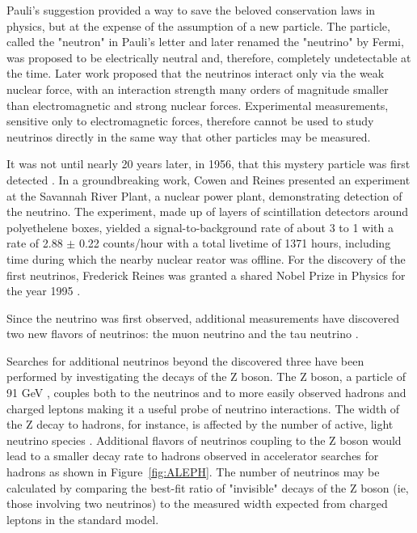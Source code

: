 Pauli's suggestion provided a way to save the beloved conservation laws in physics, but at the expense of the assumption of a new particle.
The particle, called the "neutron" in Pauli's letter and later renamed the "neutrino" by Fermi, was proposed to be electrically neutral and, therefore, completely undetectable at the time.
Later work proposed that the neutrinos interact only via the weak nuclear force, with an interaction strength many orders of magnitude smaller than electromagnetic and strong nuclear forces.
Experimental measurements, sensitive only to electromagnetic forces, therefore cannot be used to study neutrinos directly in the same way that other particles may be measured.

It was not until nearly 20 years later, in 1956, that this mystery particle was first detected \cite{Cowan-Reines}. 
In a groundbreaking work, Cowen and Reines presented an experiment at the Savannah River Plant, a nuclear power plant, demonstrating detection of the neutrino.
The experiment, made up of layers of scintillation detectors around polyethelene boxes, yielded a signal-to-background rate of about 3 to 1 with a rate of 2.88 $\pm$ 0.22 counts/hour with a total livetime of 1371 hours, including time during which the nearby nuclear reator was offline.
For the discovery of the first neutrinos, Frederick Reines was granted a shared Nobel Prize in Physics for the year 1995 \cite{NobelPrize:1995-Reines}.

Since the neutrino was first observed, additional measurements have discovered two new flavors of neutrinos: the muon neutrino \cite{Danby-NuMu} and the tau neutrino \cite{DONUT-2001, DONUT-2007}.

Searches for additional neutrinos beyond the discovered three have been performed by investigating the decays of the Z boson. 
The Z boson, a particle of 91 GeV \cite{pdg}, couples both to the neutrinos and to more easily observed hadrons and charged leptons making it a useful probe of neutrino interactions.
The width of the Z decay to hadrons, for instance, is affected by the number of active, light neutrino species \cite{ALEPH-3Nu}.
Additional flavors of neutrinos coupling to the Z boson would lead to a smaller decay rate to hadrons observed in accelerator searches for hadrons as shown in Figure~\ref{fig:ALEPH}.
The number of neutrinos may be calculated by comparing the best-fit ratio of "invisible" decays of the Z boson (ie, those involving two neutrinos) to the measured width expected from charged leptons in the standard model.


